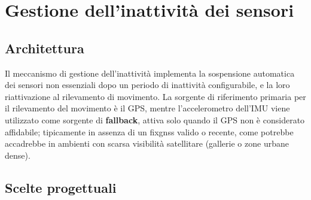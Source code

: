 \newpage

\section{Gestione dell'inattività dei sensori} \label{sec:inattivita}

\subsection{Architettura}

Il meccanismo di gestione dell'inattività implementa la sospensione automatica dei sensori non essenziali dopo un periodo di
inattività configurabile, e la loro riattivazione al rilevamento di movimento. La sorgente di riferimento primaria per il rilevamento del movimento
è il GPS, mentre l'accelerometro dell'IMU viene utilizzato come sorgente di \textbf{fallback}, attiva solo quando
il GPS non è considerato affidabile; tipicamente in assenza di un \gls{fixgnss} valido o recente, come potrebbe 
accadrebbe in ambienti con scarsa visibilità satellitare (gallerie o zone urbane dense).
\subsection{Scelte progettuali}

